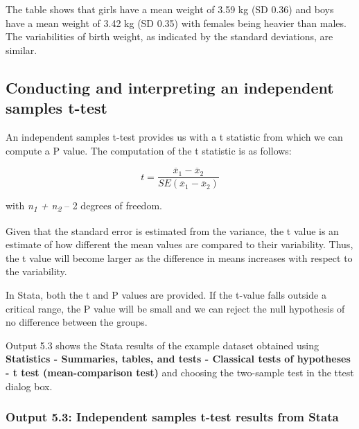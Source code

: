 \documentclass[
]{memoir}
\begin{document}
The table shows that girls have a mean weight of 3.59 kg (SD 0.36) and boys have a mean weight of 3.42 kg (SD 0.35) with females being heavier than males. The variabilities of birth weight, as indicated by the standard deviations, are similar.

\hypertarget{conducting-and-interpreting-an-independent-samples-t-test}{%
\subsection{Conducting and interpreting an independent samples t-test}\label{conducting-and-interpreting-an-independent-samples-t-test}}

An independent samples t-test provides us with a t statistic from which we can compute a P value. The computation of the t statistic is as follows:

\[t = \frac{{\overline{x}}_{1} - {\overline{x}}_{2}}{SE({\overline{x}}_{1} - {\overline{x}}_{2})}\]

with \emph{n\textsubscript{1} + n\textsubscript{2}} -- 2 degrees of freedom.

Given that the standard error is estimated from the variance, the t value is an estimate of how different the mean values are compared to their variability. Thus, the t value will become larger as the difference in means increases with respect to the variability.

In Stata, both the t and P values are provided. If the t-value falls outside a critical range, the P value will be small and we can reject the null hypothesis of no difference between the groups.

Output 5.3 shows the Stata results of the example dataset obtained using \textbf{Statistics - Summaries, tables, and tests - Classical tests of hypotheses - t test (mean-comparison test)} and choosing the two-sample test in the ttest dialog box.

\hypertarget{output-5.3-independent-samples-t-test-results-from-stata}{%
\subsubsection{Output 5.3: Independent samples t-test results from Stata}\label{output-5.3-independent-samples-t-test-results-from-stata}}
\end{document}
